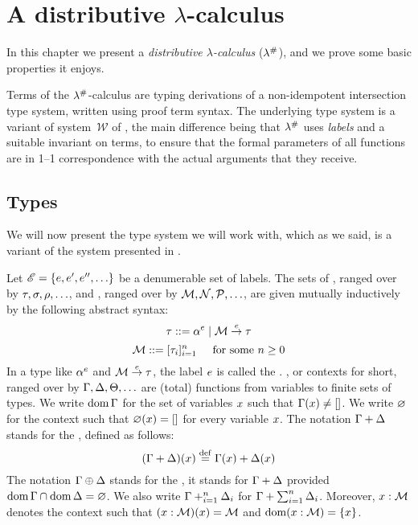 \chapter{A distributive $\lambda$-calculus}

In this chapter we present a
{\em distributive $\lambda$-calculus} ($\lambda^{\mathtt{\#}}$),
and we prove some basic properties it enjoys.

Terms of the $\lambda^{\mathtt{\#}}$-calculus are typing derivations of a non-idempotent intersection type
system, written using proof term syntax.
The underlying type system is a variant of
system~$\mathcal{W}$ of \cite{bucciarelli2014inhabitation,bucciarelli2017non},
the main difference being that $\lambda^{\mathtt{\#}}$
uses {\em labels} and a suitable invariant on terms,
to ensure that the formal parameters of all functions
are in 1--1 correspondence with the actual arguments that they receive.


\section{Types}

We will now present the type system we will work with, which as we said, is a variant of the system presented
in \cite{bucciarelli2017non}.

\begin{definition}
Let $\mathscr{E} = \{e,e',e'',\hdots\}$ be a denumerable set of labels.
The sets of , ranged over by $\tau,\sigma,\rho,\hdots$,
and , ranged over by $\mathcal{M},\mathcal{N},\mathcal{P},\hdots$,
are given mutually inductively by the following abstract syntax:
\[
  \tau ::= \alpha^{e} \mid \mathcal{M} \overset{e}{\to} \tau
\]
\[
  \mathcal{M} ::= [\tau_i]_{i=1}^{n} \hspace{.5cm} \text{for some $n \geq 0$}
\]
In a type like $\alpha^{e}$ and $\mathcal{M} \overset{e}{\to} \tau$,
the label $e$ is called the .
, or contexts for short,
ranged over by $\Gamma,\Delta,\Theta,\hdots$ are (total) functions from variables to finite sets of types.
We write $\operatorname{dom}\Gamma$ for the set of variables $x$ such that $\Gamma(x) \neq []$.
We write $\varnothing$ for the context such that $\varnothing(x) = []$ for every variable $x$.
The notation $\Gamma + \Delta$ stands for the , defined as follows:
\[
    (\Gamma + \Delta)(x) \overset{\mathrm{def}}{=} \Gamma(x) + \Delta(x)
\]
The notation $\Gamma \oplus \Delta$ stands for the ,
\ie it stands for $\Gamma + \Delta$ provided $\operatorname{dom}\Gamma \cap \operatorname{dom}\Delta = \varnothing$.
We also write $\Gamma +_{i=1}^{n} \Delta_i$ for $\Gamma + \sum_{i=1}^{n} \Delta_i$.
Moreover, $x : \mathcal{M}$ denotes the context such that $(x : \mathcal{M})(x) = \mathcal{M}$
and $\operatorname{dom}(x : \mathcal{M}) = \{x\}$.
\end{definition}


